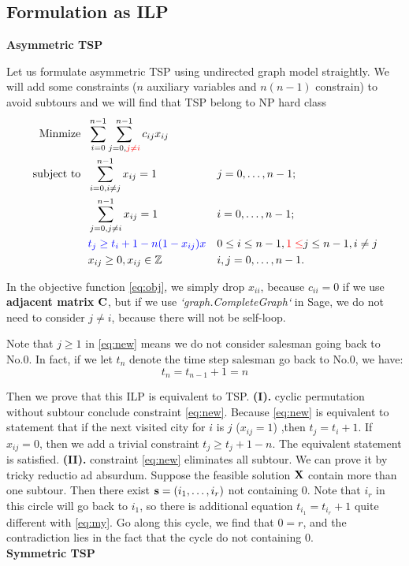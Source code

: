 \documentclass{mcmthesis}
\begin{document}
\subsection{Formulation as ILP }

{\large{\textbf{Asymmetric TSP}}}

Let us formulate asymmetric TSP using undirected graph model straightly. We will add some constraints (\ie $n$ auxiliary variables and $n(n-1)$ constrain) to avoid subtours and we will find that TSP belong to NP hard   class  
\begin{align}
	\mathop{\mathrm{Minmize \ \  }}       &\sum _{i=0}^{n-1}\sum _{j=0,{\color{Red} j\neq i}}^{n-1}c_{ij}x_{ij} &  & \label{eq:obj}                     \\
	\mathop{\mathrm{subject \  to \ \  }} & \sum _{i=0,i\neq j}^{n-1}x_{ij}=1                    &  & j=0,\ldots ,n-1;  \notag     \\
	                                      & \sum _{j=0,j\neq i}^{n-1}x_{ij}=1                    &  & i=0,\ldots ,n-1;      \notag \\
	                                      & \color{Blue} t_{j} \ge t_{i}+1-n(1-x_{ij})x  &  & 0\leq i\leq n-1, {\color{Red}1 \le} j \le n-1, i \neq j   \label{eq:new}     \\
	                                      & x_{ij} \geq 0, x_{ij} \in \Zbb                     &  & i,j=0,\ldots ,n-1. \notag
\end{align}

In the objective function \eqref{eq:obj},  we simply drop $x_{ii}$, because $c_{ii}=0$ if we use \textbf{adjacent matrix} $\mathbf{C}$, but if we use \textit{`graph.CompleteGraph`} in Sage, we do not need to consider $j \ne i$, because there will not be self-loop.  

Note that $j \ge 1 $ in \eqref{eq:new} means we do not consider salesman going back to No.0. In fact, if we let $t_{n}$ denote the time step salesman go back to No.0, we have:
\begin{equation}\label{eq:my}
t_{n}=t_{n-1}+1=n 
\end{equation}

Then we prove that this ILP is equivalent to TSP. \quad \textbf{(I).} cyclic permutation without subtour conclude constraint \eqref{eq:new}. Because \eqref{eq:new} is equivalent to statement that   if the next visited city for $i$ is $j$ ($x_{ij}=1$) ,then $t_j=t_i+1$. If $x_{ij}=0$, then we add a trivial constraint $t_j \ge t_j +1-n$.  The equivalent statement is satisfied.  \quad \textbf{(II).} constraint \eqref{eq:new} eliminates all subtour. We can prove it by tricky reductio ad absurdum. Suppose the feasible solution $\mathbf{X}$ contain more than one subtour. Then there exist $\mathbf{s}=(i_1,\dots,i_r)$ not containing 0. Note that $i_r$ in this circle will go back to $i_1$, so there is additional equation $t_{i_1}=t_{i_r}+1$  quite different with \eqref{eq:my}. Go along this cycle, we find that $0=r$, and the contradiction lies in the fact that the cycle do not containing 0. \vspace{1em}
\\{\textbf{\large{Symmetric TSP}}}
\end{document}
